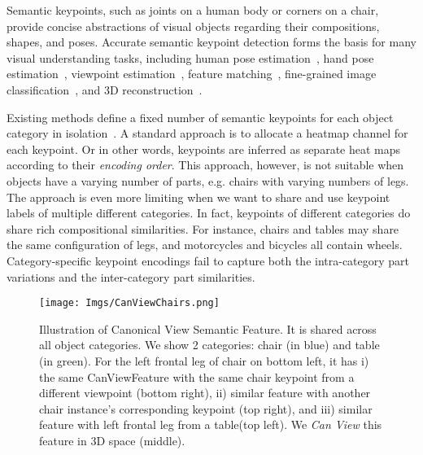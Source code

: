 \documentclass[runningheads]{llncs}
\begin{document}
Semantic keypoints, such as joints on a human body or corners on a chair,  provide concise abstractions of visual objects regarding their compositions, shapes, and poses. 
Accurate semantic keypoint detection 
forms the basis for many visual understanding tasks, including human pose estimation~\cite{cao2017realtime,newell2016stacked,pavlakos2017coarse,zhou2016deep}, 
hand pose estimation~\cite{yuan20173d,zhou2016model}, 
viewpoint estimation~\cite{pavlakos20176,tulsiani2015viewpoints},
feature matching~\cite{long2014convnets}, fine-grained image classification~\cite{zhang2014part}, and 3D reconstruction~\cite{drcTulsiani17,marrnet,shapesKarTCM15,cmrKanazawa18}.


Existing methods define a fixed number of semantic keypoints for each object category in isolation~\cite{tulsiani2015viewpoints,pavlakos20176,wu2016single,newell2016stacked}. A standard approach is to allocate a heatmap channel for each keypoint. Or in other words, keypoints are inferred as separate heat maps according to their \emph{encoding order}. 
This approach, however, is not suitable when objects have a varying number of parts, e.g. chairs with varying numbers of legs. 
The approach is even more limiting when we want to share and use keypoint labels of multiple different categories. 
In fact, keypoints of different categories do share rich compositional similarities. 
For instance, chairs and tables may share the same configuration of legs, and motorcycles and bicycles all contain wheels. 
Category-specific keypoint encodings fail to capture both the intra-category part variations and the inter-category part similarities.

\begin{figure}[t]
\centering
\texttt{[image: Imgs/CanViewChairs.png]}
\caption{Illustration of Canonical View Semantic Feature. It is shared across all object categories. We show 2 categories: chair (in blue) and table (in green). For the left frontal leg of chair on bottom left, it has i) the same CanViewFeature with the same chair keypoint from a different viewpoint (bottom right), ii) similar feature with another chair instance's corresponding keypoint (top right), and iii) similar feature with left frontal leg from a table(top left). We \emph{Can View} this feature in 3D space (middle).}
\label{fig:canview}
\end{figure}
\end{document}

